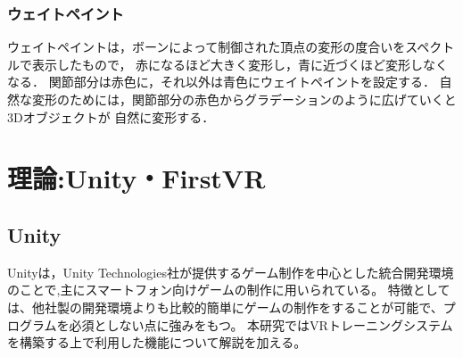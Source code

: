 \documentclass{ltjsreport}
\begin{document}
		\subsection{ウェイトペイント}
			ウェイトペイントは，ボーンによって制御された頂点の変形の度合いをスペクトルで表示したもので，
			赤になるほど大きく変形し，青に近づくほど変形しなくなる．
			関節部分は赤色に，それ以外は青色にウェイトペイントを設定する．
			自然な変形のためには，関節部分の赤色からグラデーションのように広げていくと3Dオブジェクトが
			自然に変形する．

\chapter{理論:Unity・FirstVR}
	\section{Unity}
		Unityは，Unity Technologies社が提供するゲーム制作を中心とした統合開発環境のことで,主にスマートフォン向けゲームの制作に用いられている。
		特徴としては、他社製の開発環境よりも比較的簡単にゲームの制作をすることが可能で、プログラムを必須としない点に強みをもつ。
		本研究ではVRトレーニングシステムを構築する上で利用した機能について解説を加える。
\end{document}
